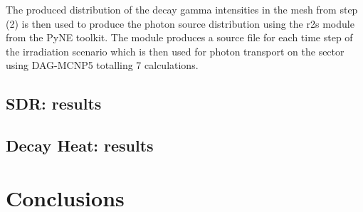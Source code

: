 \documentclass[12pt, letterpaper]{elsarticle}
\begin{document}
The produced distribution of the decay gamma intensities in the mesh from step (2) is then used to produce the photon source distribution using the r2s module from the PyNE toolkit. The module produces a source file for each time step of the irradiation scenario which is then used for photon transport on the sector using DAG-MCNP5 totalling 7 calculations.\vspace{5mm}

\subsection{SDR: results} \label{SDR}


\subsection{Decay Heat: results} \label{Decay Heat}


\section{Conclusions} \label{conclusion}

\newpage
\end{document}
